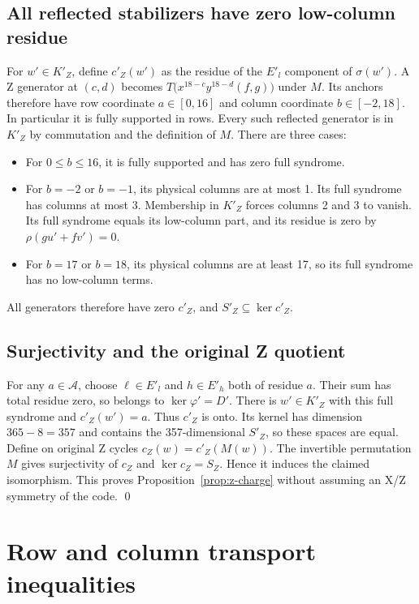 \documentclass{article}
\begin{document}
\subsection{All reflected stabilizers have zero low-column residue}\label{sec:z-stabilizers}

For \(w' \in K'_Z\), define \(c'_Z(w')\) as the residue of the \(E'_l\) component of
\(\sigma(w')\). A Z generator at \((c,d)\) becomes
\(T\bigl(x^{18-c} y^{18-d} (f, g)\bigr)\) under \(M\). Its anchors therefore have row
coordinate \(a \in [0,16]\) and column coordinate \(b \in [-2,18]\). In particular it is
fully supported in rows. Every such reflected generator is in \(K'_Z\) by commutation and the
definition of \(M\). There are three cases:
\begin{itemize}
  \item For \(0 \le b \le 16\), it is fully supported and has zero full syndrome.
  \item For \(b = -2\) or \(b = -1\), its physical columns are at most 1. Its full syndrome
    has columns at most 3. Membership in \(K'_Z\) forces columns 2 and 3 to vanish. Its full
    syndrome equals its low-column part, and its residue is zero by
    \(\rho(gu' + fv') = 0\).
  \item For \(b = 17\) or \(b = 18\), its physical columns are at least 17, so its full
    syndrome has no low-column terms.
\end{itemize}
All generators therefore have zero \(c'_Z\), and \(S'_Z \subseteq \ker c'_Z\).

\subsection{Surjectivity and the original Z quotient}\label{sec:z-quotient}

For any \(a \in \mathcal{A}\), choose \(\ell \in E'_l\) and \(h \in E'_h\) both of residue
\(a\). Their sum has total residue zero, so belongs to \(\ker \varphi' = D'\). There is
\(w' \in K'_Z\) with this full syndrome and \(c'_Z(w') = a\). Thus \(c'_Z\) is onto. Its
kernel has dimension \(365 - 8 = 357\) and contains the 357-dimensional \(S'_Z\), so these
spaces are equal. Define on original Z cycles \(c_Z(w) = c'_Z(M(w))\). The invertible
permutation \(M\) gives surjectivity of \(c_Z\) and \(\ker c_Z = S_Z\). Hence it induces the
claimed isomorphism. This proves Proposition~\ref{prop:z-charge} without assuming an X/Z symmetry
of the code. \qed

\section{Row and column transport inequalities}\label{sec:transport}
\end{document}
